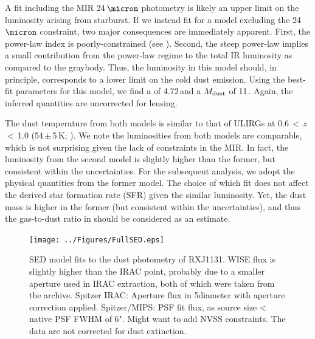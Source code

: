 \documentclass[]{emulateapj}
\begin{document}
A fit including the MIR 24\,$\micron$ photometry
is likely an upper limit on the \fir luminosity arising from starburst.
If we instead fit for a model excluding the 24\,$\micron$ constraint,
two major consequences are immediately apparent.
First, the power-law index is poorly-constrained (see ).
Second, the steep power-law implies a small contribution
from the power-law regime
to the total IR luminosity as compared to the graybody.
Thus, the \fir luminosity in
this model should, in principle, corresponds to a
lower limit on the cold dust emission.
Using the best-fit parameters
for this model, we find a  \LFIR of 4.72\,\Lsun and a $M_{\rm dust}$ of 11\,\Msun.
Again, the inferred quantities are uncorrected for lensing.

The dust temperature from both models is similar to that of
ULIRGs at 0.6\,$<$\,$z$\,$<$\,1.0 (54\,$\pm$\,5\,K; \citealt[hereafter C13]{Combes13a}).
We note the \fir luminosities from both models are comparable, which is
not surprising given the lack of constraints in the MIR. In fact, the
\fir luminosity from the second model is slightly higher than the former, but
consistent within the uncertainties.
For the subsequent analysis, we adopt the physical quantities
from the former model. The choice of which fit does not affect
the derived star formation rate (SFR) given the similar \fir luminosity.
Yet, the dust mass is higher in the former (but consistent within the
uncertainties), and thus the gas-to-dust ratio in 
should be considered as an estimate.

\begin{figure}[!htbp]
\centering
\texttt{[image: ../Figures/FullSED.eps]}
\caption{SED model fits to the dust photometry of RXJ1131.
WISE flux is slightly higher than the IRAC point, probably due to a smaller
aperture used in IRAC extraction, both of which were taken from the archive.
Spitzer IRAC:
Aperture flux in 5\farcs diameter with aperture correction applied.
Spitzer/MIPS: PSF fit flux, as source size <
native PSF FWHM of 6".
Might want to add NVSS constraints.
The data are not corrected for dust extinction.
\label{fig:SED}}
\end{figure}
\end{document}
